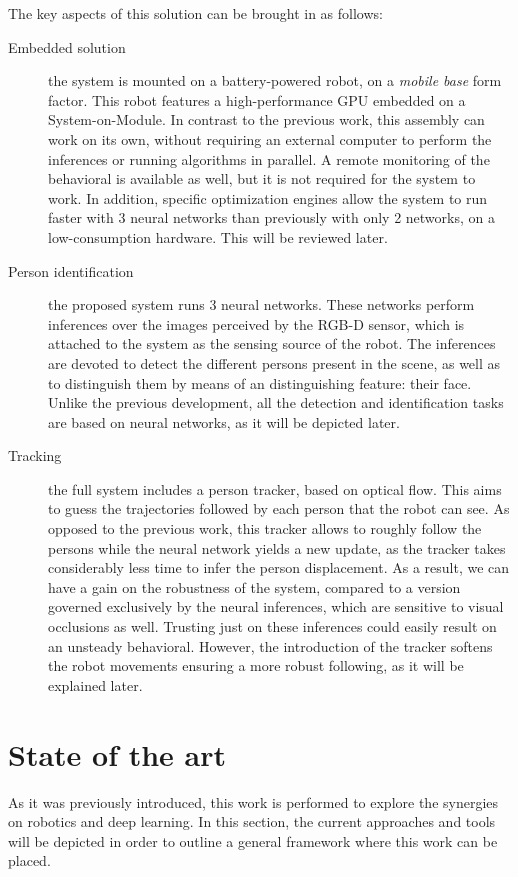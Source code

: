 	The key aspects of this solution can be brought in as follows:
	\begin{description}
		\item[Embedded solution] the system is mounted on a battery-powered robot, on a \textit{mobile base} form factor. This robot features a high-performance GPU embedded on a System-on-Module. In contrast to the previous work, this assembly can work on its own, without requiring an external computer to perform the inferences or running algorithms in parallel. A remote monitoring of the behavioral is available as well, but it is not required for the system to work. In addition, specific optimization engines allow the system to run faster with 3 neural networks than previously with only 2 networks, on a low-consumption hardware. This will be reviewed later.

		\item[Person identification] the proposed system runs 3 neural networks. These networks perform inferences over the images perceived by the RGB-D sensor, which is attached to the system as the sensing source of the robot. The inferences are devoted to detect the different persons present in the scene, as well as to distinguish them by means of an distinguishing feature: their face. Unlike the previous development, all the detection and identification tasks are based on neural networks, as it will be depicted later.

		\item[Tracking] the full system includes a person tracker, based on optical flow. This aims to guess the trajectories followed by each person that the robot can see. As opposed to the previous work, this tracker allows to roughly follow the persons while the neural network yields a new update, as the tracker takes considerably less time to infer the person displacement. As a result, we can have a gain on the robustness of the system, compared to a version governed exclusively by the neural inferences, which are sensitive to visual occlusions as well. Trusting just on these inferences could easily result on an unsteady behavioral. However, the introduction of the tracker softens the robot movements ensuring a more robust following, as it will be explained later.
	\end{description}
	

	
\section{State of the art}
\label{sec:1_sota}
	As it was previously introduced, this work is performed to explore the synergies on robotics and deep learning. In this section, the current approaches and tools will be depicted in order to outline a general framework where this work can be placed.\\
	
